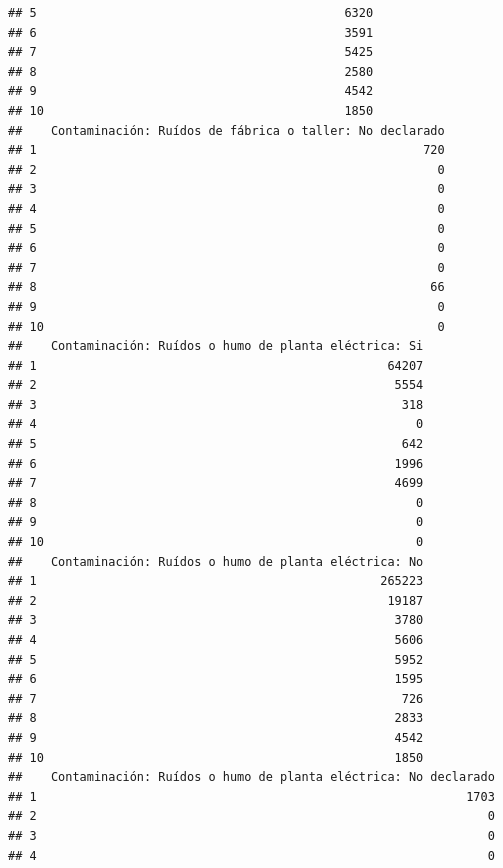 \documentclass[11pt,]{article}
\begin{document}
\begin{verbatim}
## 5                                           6320
## 6                                           3591
## 7                                           5425
## 8                                           2580
## 9                                           4542
## 10                                          1850
##    Contaminación: Ruídos de fábrica o taller: No declarado
## 1                                                      720
## 2                                                        0
## 3                                                        0
## 4                                                        0
## 5                                                        0
## 6                                                        0
## 7                                                        0
## 8                                                       66
## 9                                                        0
## 10                                                       0
##    Contaminación: Ruídos o humo de planta eléctrica: Si
## 1                                                 64207
## 2                                                  5554
## 3                                                   318
## 4                                                     0
## 5                                                   642
## 6                                                  1996
## 7                                                  4699
## 8                                                     0
## 9                                                     0
## 10                                                    0
##    Contaminación: Ruídos o humo de planta eléctrica: No
## 1                                                265223
## 2                                                 19187
## 3                                                  3780
## 4                                                  5606
## 5                                                  5952
## 6                                                  1595
## 7                                                   726
## 8                                                  2833
## 9                                                  4542
## 10                                                 1850
##    Contaminación: Ruídos o humo de planta eléctrica: No declarado
## 1                                                            1703
## 2                                                               0
## 3                                                               0
## 4                                                               0

\end{verbatim}
\end{document}
